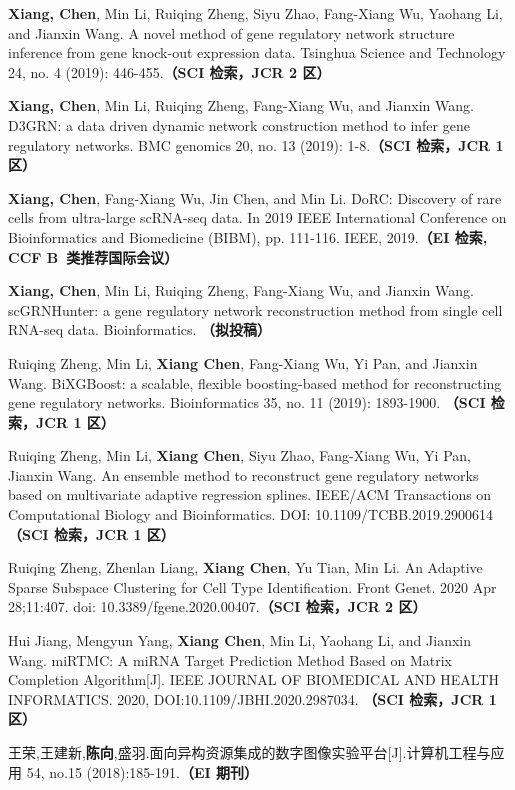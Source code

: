 \else
\begin{enumerate}[label={[\arabic*]},itemindent=2em,wide]

\item \textbf{Xiang, Chen}, Min Li, Ruiqing Zheng, Siyu Zhao, Fang-Xiang Wu, Yaohang Li, and Jianxin Wang. A novel method of gene regulatory network structure inference from gene knock-out expression data. Tsinghua Science and Technology 24, no. 4 (2019): 446-455.{\bfseries \heiti（SCI 检索，JCR 2 区）} 
\item \textbf{Xiang, Chen}, Min Li, Ruiqing Zheng, Fang-Xiang Wu, and Jianxin Wang. D3GRN: a data driven dynamic network construction method to infer gene regulatory networks. BMC genomics 20, no. 13 (2019): 1-8.{\bfseries \heiti（SCI 检索，JCR 1 区）} 
\item \textbf{Xiang, Chen}, Fang-Xiang Wu, Jin Chen, and Min Li. DoRC: Discovery of rare cells from ultra-large scRNA-seq data. In 2019 IEEE International Conference on Bioinformatics and Biomedicine (BIBM), pp. 111-116. IEEE, 2019.{\bfseries \heiti（EI 检索, CCF B~类推荐国际会议）}
\item \textbf{Xiang, Chen}, Min Li, Ruiqing Zheng, Fang-Xiang Wu, and Jianxin Wang. scGRNHunter: a gene regulatory network reconstruction method from single cell RNA-seq data. Bioinformatics. {\bfseries \heiti（拟投稿）}
\item Ruiqing Zheng, Min Li, \textbf{Xiang Chen}, Fang-Xiang Wu, Yi Pan, and Jianxin Wang. BiXGBoost: a scalable, flexible boosting-based method for reconstructing gene regulatory networks. Bioinformatics 35, no. 11 (2019): 1893-1900. {\bfseries \heiti（SCI 检索，JCR 1 区）}
\item Ruiqing Zheng, Min Li, \textbf{Xiang Chen}, Siyu Zhao, Fang-Xiang Wu, Yi Pan, Jianxin Wang. An ensemble method to reconstruct gene regulatory networks based on multivariate adaptive regression splines. IEEE/ACM Transactions on Computational Biology and Bioinformatics. DOI: 10.1109/TCBB.2019.2900614  {\bfseries \heiti（SCI 检索，JCR 1 区）}
\item Ruiqing Zheng, Zhenlan Liang, \textbf{Xiang Chen}, Yu Tian, Min Li. An Adaptive Sparse Subspace Clustering for Cell Type Identification. Front Genet. 2020 Apr 28;11:407. doi: 10.3389/fgene.2020.00407.{\bfseries \heiti（SCI 检索，JCR 2 区）}
\item Hui Jiang, Mengyun Yang, \textbf{Xiang Chen}, Min Li, Yaohang Li, and Jianxin Wang. miRTMC: A miRNA Target Prediction Method Based on Matrix Completion Algorithm[J]. IEEE JOURNAL OF BIOMEDICAL AND HEALTH INFORMATICS. 2020, DOI:10.1109/JBHI.2020.2987034. {\bfseries \heiti（SCI 检索，JCR 1 区）}
\item 王荣,王建新,\textbf{陈向},盛羽.面向异构资源集成的数字图像实验平台[J].计算机工程与应用 54, no.15 (2018):185-191.{\bfseries \heiti（EI 期刊）}
\end{enumerate}
\fi

